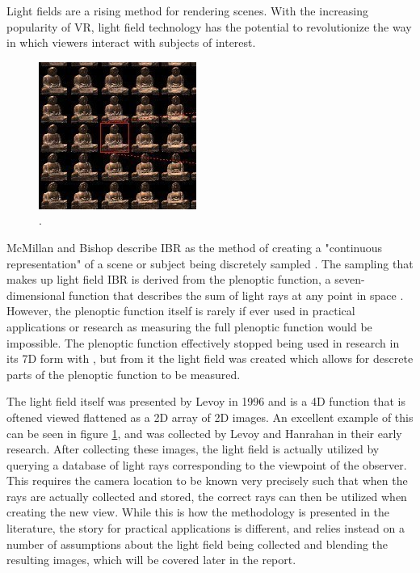 \documentclass[12pt]{report}
\begin{document}
Light fields are a rising method for rendering scenes. With the increasing popularity of VR, light field technology has the potential to revolutionize the way in which viewers interact with subjects of interest.
\begin{figure}[!ht]
	\centering
	\includegraphics[scale=0.75]{levoy_lf.jpg}
	\caption{ \cite{Levoy96}.}
	\label{fig:levoy_lf}
\end{figure}
McMillan and Bishop describe IBR as the method of creating a "continuous representation" of a scene or subject being discretely sampled \cite{McMillan95}. The sampling that makes up light field IBR is derived from the plenoptic function, a seven-dimensional function that describes the sum of light rays at any point in space \cite{Adelson91}. However, the plenoptic function itself is rarely if ever used in practical applications or research as measuring the full plenoptic function would be impossible. The plenoptic function effectively stopped being used in research in its 7D form with \cite{Adelson91}, but from it the light field was created which allows for descrete parts of the plenoptic function to be measured.

The light field itself was presented by Levoy in 1996 and is a 4D function that is oftened viewed flattened as a 2D array of 2D images. An excellent example of this can be seen in figure \ref{fig:levoy_lf}, and was collected by Levoy and Hanrahan in their early research. After collecting these images, the light field is actually utilized by querying a database of light rays corresponding to the viewpoint of the observer. This requires the camera location to be known very precisely such that when the rays are actually collected and stored, the correct rays can then be utilized when creating the new view. While this is how the methodology is presented in the literature, the story for practical applications is different, and relies instead on a number of assumptions about the light field being collected and blending the resulting images, which will be covered later in the report.
\end{document}
